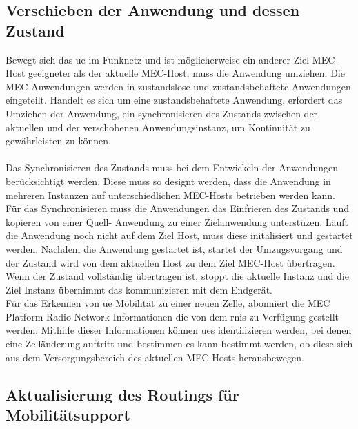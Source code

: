 \documentclass[runningheads]{llncs}
\numberwithin{figure}{section}
\begin{document}
\subsection{Verschieben der Anwendung und dessen Zustand}
Bewegt sich das \acrshort{ue} im Funknetz und ist möglicherweise ein anderer Ziel MEC-Host geeigneter als der aktuelle
MEC-Host, muss die Anwendung umziehen. Die MEC-Anwendungen werden in zustandslose und zustandsbehaftete Anwendungen eingeteilt.
Handelt es sich um eine zustandsbehaftete Anwendung, 
erfordert das Umziehen der Anwendung, ein synchronisieren des Zustands zwischen der aktuellen und der
verschobenen Anwendungsinstanz, um Kontinuität zu gewährleisten zu können.
\\
\\
Das Synchronisieren des Zustands muss bei dem Entwickeln der Anwendungen berücksichtigt werden. Diese muss so designt werden, 
dass die Anwendung in mehreren Instanzen auf unterschiedlichen MEC-Hosts betrieben werden kann. 
Für das Synchronisieren muss die Anwendungen das Einfrieren des Zustands und kopieren von einer Quell- Anwendung 
zu einer Zielanwendung unterstüzen. 
Läuft die Anwendung noch nicht auf dem Ziel Host, muss diese initalisiert und gestartet werden.
Nachdem die Anwendung gestartet ist, startet der Umzugsvorgang und der Zustand wird von dem aktuellen 
Host zu dem Ziel MEC-Host übertragen. Wenn der Zustand vollständig übertragen ist, stoppt die aktuelle Instanz
und die Ziel Instanz übernimmt das kommunizieren mit dem Endgerät.
\\
Für das Erkennen von \acrshort{ue} Mobilität zu einer neuen Zelle, abonniert die MEC Platform Radio Network Informationen die von dem \acrfull{rnis} zu
Verfügung gestellt werden. Mithilfe dieser Informationen können \acrshort{ue}s identifizieren werden, bei denen eine Zelländerung auftritt 
und bestimmen es kann bestimmt werden, ob diese sich aus dem Versorgungsbereich des aktuellen MEC-Hosts herausbewegen.
\subsection{Aktualisierung des Routings für Mobilitätsupport}
\end{document}
